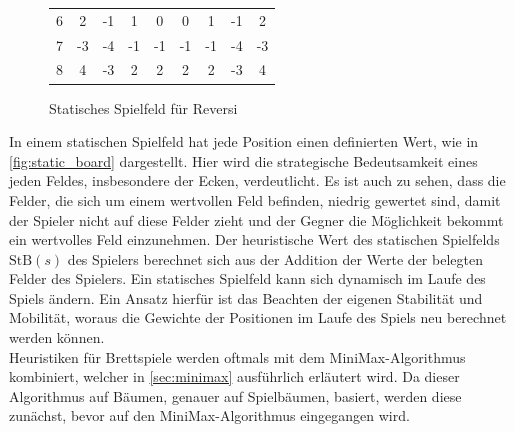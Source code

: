 \documentclass[12pt,a4paper,bibliography=totocnumbered,listof=totocnumbered]{article}
\begin{document}
\begin{figure}[h]
\begin{tabular}{ccccccccc}
\multicolumn{1}{c|}{6} & \multicolumn{1}{c|}{\cellcolor[HTML]{34FF34}2}  & \multicolumn{1}{c|}{\cellcolor[HTML]{FFFE65}-1} & \multicolumn{1}{c|}{\cellcolor[HTML]{9AFF99}1}  & \multicolumn{1}{c|}{0}                          & \multicolumn{1}{c|}{0}                          & \multicolumn{1}{c|}{\cellcolor[HTML]{9AFF99}1}  & \multicolumn{1}{c|}{\cellcolor[HTML]{FFFE65}-1} & \multicolumn{1}{c|}{\cellcolor[HTML]{34FF34}2}  \\ \cline{2-9} 
\multicolumn{1}{c|}{7} & \multicolumn{1}{c|}{\cellcolor[HTML]{F8A102}-3} & \multicolumn{1}{c|}{\cellcolor[HTML]{FE0000}-4} & \multicolumn{1}{c|}{\cellcolor[HTML]{FFFE65}-1} & \multicolumn{1}{c|}{\cellcolor[HTML]{FFFE65}-1} & \multicolumn{1}{c|}{\cellcolor[HTML]{FFFE65}-1} & \multicolumn{1}{c|}{\cellcolor[HTML]{FFFE65}-1} & \multicolumn{1}{c|}{\cellcolor[HTML]{FE0000}-4} & \multicolumn{1}{c|}{\cellcolor[HTML]{F8A102}-3} \\ \cline{2-9} 
\multicolumn{1}{c|}{8} & \multicolumn{1}{c|}{\cellcolor[HTML]{32CB00}4}  & \multicolumn{1}{c|}{\cellcolor[HTML]{F8A102}-3} & \multicolumn{1}{c|}{\cellcolor[HTML]{34FF34}2}  & \multicolumn{1}{c|}{\cellcolor[HTML]{34FF34}2}  & \multicolumn{1}{c|}{\cellcolor[HTML]{34FF34}2}  & \multicolumn{1}{c|}{\cellcolor[HTML]{34FF34}2}  & \multicolumn{1}{c|}{\cellcolor[HTML]{F8A102}-3} & \multicolumn{1}{c|}{\cellcolor[HTML]{32CB00}4}  \\ \cline{2-9} 
\end{tabular}
	\caption{Statisches Spielfeld für Reversi \citep[In Anlehnung an][]{VaishnaviSannidhanam.2015}}
	\label{fig:static_board}
\end{figure}
In einem statischen Spielfeld hat jede Position einen definierten Wert, wie in  \autoref{fig:static_board} dargestellt. Hier wird die strategische Bedeutsamkeit eines jeden Feldes, insbesondere der Ecken, verdeutlicht. Es ist auch zu sehen, dass die Felder, die sich um einem wertvollen Feld befinden, niedrig gewertet sind, damit der Spieler nicht auf diese Felder zieht und der Gegner die Möglichkeit bekommt ein wertvolles Feld einzunehmen. Der heuristische Wert des statischen Spielfelds $\text{StB}(s)$ des Spielers berechnet sich aus der Addition der Werte der belegten Felder des Spielers. 
Ein statisches Spielfeld kann sich dynamisch im Laufe des Spiels ändern. Ein Ansatz hierfür ist das Beachten der eigenen Stabilität und Mobilität, woraus die Gewichte der Positionen im Laufe des Spiels neu berechnet werden können.\\
Heuristiken für Brettspiele werden oftmals mit dem MiniMax-Algorithmus kombiniert, welcher in \autoref{sec:minimax} ausführlich erläutert wird. Da dieser Algorithmus auf Bäumen, genauer auf Spielbäumen, basiert, werden diese zunächst, bevor auf den MiniMax-Algorithmus eingegangen wird.
\end{document}
